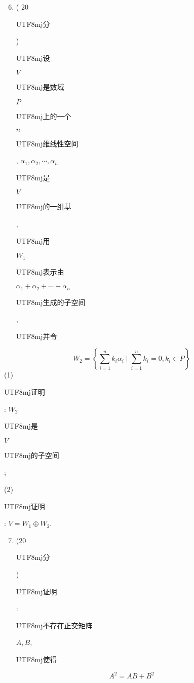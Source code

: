\documentclass[10pt]{article}
\begin{document}
\begin{enumerate}
  \setcounter{enumi}{5}
  \item ( 20 \begin{CJK}{UTF8}{mj}分\end{CJK}) \begin{CJK}{UTF8}{mj}设\end{CJK} $V$ \begin{CJK}{UTF8}{mj}是数域\end{CJK} $P$ \begin{CJK}{UTF8}{mj}上的一个\end{CJK} $n$ \begin{CJK}{UTF8}{mj}维线性空间\end{CJK}, $\alpha_{1}, \alpha_{2}, \cdots, \alpha_{n}$ \begin{CJK}{UTF8}{mj}是\end{CJK} $V$ \begin{CJK}{UTF8}{mj}的一组基\end{CJK}, \begin{CJK}{UTF8}{mj}用\end{CJK} $W_{1}$ \begin{CJK}{UTF8}{mj}表示由\end{CJK} $\alpha_{1}+\alpha_{2}+\cdots+\alpha_{n}$ \begin{CJK}{UTF8}{mj}生成的子空间\end{CJK}, \begin{CJK}{UTF8}{mj}并令\end{CJK}
\end{enumerate}
$$
W_{2}=\left\{\sum_{i=1}^{n} k_{i} \alpha_{i} \mid \sum_{i=1}^{n} k_{i}=0, k_{i} \in P\right\}
$$
(1) \begin{CJK}{UTF8}{mj}证明\end{CJK}: $W_{2}$ \begin{CJK}{UTF8}{mj}是\end{CJK} $V$ \begin{CJK}{UTF8}{mj}的子空间\end{CJK};

(2) \begin{CJK}{UTF8}{mj}证明\end{CJK}: $V=W_{1} \oplus W_{2}$.

\begin{enumerate}
  \setcounter{enumi}{6}
  \item (20 \begin{CJK}{UTF8}{mj}分\end{CJK}) \begin{CJK}{UTF8}{mj}证明\end{CJK}: \begin{CJK}{UTF8}{mj}不存在正交矩阵\end{CJK} $A, B$, \begin{CJK}{UTF8}{mj}使得\end{CJK}
\end{enumerate}
$$
A^{2}=A B+B^{2}
$$
\end{document}
